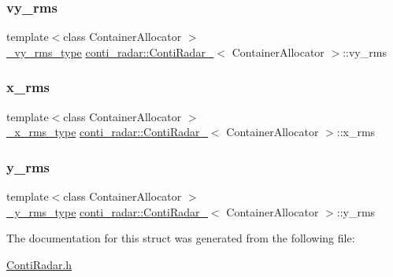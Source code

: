 \mbox{\label{structconti__radar_1_1ContiRadar___a2f8cabc04a26dfb723121996c8b82c00}} 
\subsubsection{\texorpdfstring{vy\+\_\+rms}{vy\_rms}}
{\footnotesize\ttfamily template$<$class Container\+Allocator $>$ \\
\hyperlink{structconti__radar_1_1ContiRadar___a25654e54b73dd98b761e31b5fb022d20}{\+\_\+vy\+\_\+rms\+\_\+type} \hyperlink{structconti__radar_1_1ContiRadar__}{conti\+\_\+radar\+::\+Conti\+Radar\+\_\+}$<$ Container\+Allocator $>$\+::vy\+\_\+rms}

\mbox{\label{structconti__radar_1_1ContiRadar___a4d7137d6aa1dcd1f1724fd4e09a16704}} 
\subsubsection{\texorpdfstring{x\+\_\+rms}{x\_rms}}
{\footnotesize\ttfamily template$<$class Container\+Allocator $>$ \\
\hyperlink{structconti__radar_1_1ContiRadar___adcb79fb27779e557e948addd1832938f}{\+\_\+x\+\_\+rms\+\_\+type} \hyperlink{structconti__radar_1_1ContiRadar__}{conti\+\_\+radar\+::\+Conti\+Radar\+\_\+}$<$ Container\+Allocator $>$\+::x\+\_\+rms}

\mbox{\label{structconti__radar_1_1ContiRadar___afba0c3f3a38b887c9c044ad6372f053a}} 
\subsubsection{\texorpdfstring{y\+\_\+rms}{y\_rms}}
{\footnotesize\ttfamily template$<$class Container\+Allocator $>$ \\
\hyperlink{structconti__radar_1_1ContiRadar___ae6571fef76edb2dfe79da331614ddcc5}{\+\_\+y\+\_\+rms\+\_\+type} \hyperlink{structconti__radar_1_1ContiRadar__}{conti\+\_\+radar\+::\+Conti\+Radar\+\_\+}$<$ Container\+Allocator $>$\+::y\+\_\+rms}



The documentation for this struct was generated from the following file\+:\begin{DoxyCompactItemize}
\item 
\hyperlink{ContiRadar_8h}{Conti\+Radar.\+h}\end{DoxyCompactItemize}
